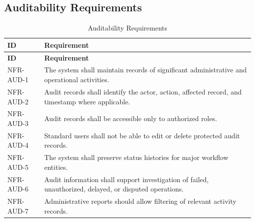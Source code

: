 \subsection{Auditability Requirements}
\begin{longtable}{@{}p{2.6cm}p{10.8cm}@{}}
\caption{Auditability Requirements} \label{tab:nfr-aud} \\
\toprule \textbf{ID} & \textbf{Requirement} \\ \midrule
\endfirsthead
\toprule \textbf{ID} & \textbf{Requirement} \\ \midrule
\endhead
NFR-AUD-1 & The system shall maintain records of significant administrative and operational activities. \\
NFR-AUD-2 & Audit records shall identify the actor, action, affected record, and timestamp where applicable. \\
NFR-AUD-3 & Audit records shall be accessible only to authorized roles. \\
NFR-AUD-4 & Standard users shall not be able to edit or delete protected audit records. \\
NFR-AUD-5 & The system shall preserve status histories for major workflow entities. \\
NFR-AUD-6 & Audit information shall support investigation of failed, unauthorized, delayed, or disputed operations. \\
NFR-AUD-7 & Administrative reports should allow filtering of relevant activity records. \\
\bottomrule
\end{longtable}

